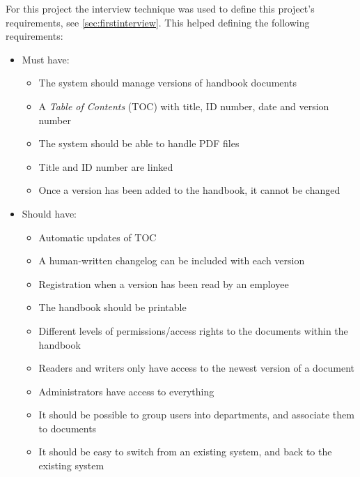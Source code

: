 For this project the interview technique was used to define this project's requirements, see \cref{sec:firstinterview}. This helped defining the following requirements:

\begin{itemize}
    \item Must have:
        \begin{itemize}
            \item The system should manage versions of handbook documents
            \item A \textit{Table of Contents} (TOC) with title, ID number, date and version number
            \item The system should be able to handle PDF files
            \item Title and ID number are linked
            \item Once a version has been added to the handbook, it cannot be changed
        \end{itemize}
    \item Should have:
        \begin{itemize}
                        \item Automatic updates of TOC
            \item A human-written changelog can be included with each version
            \item Registration when a version has been read by an employee
            \item The handbook should be printable
            \item Different levels of permissions/access rights to the documents within the handbook
            \item Readers and writers only have access to the newest version of a document
            \item Administrators have access to everything
            \item It should be possible to group users into departments, and associate them to documents
            \item It should be easy to switch from an existing system, and back to the existing system


\end{itemize}
\end{itemize}
